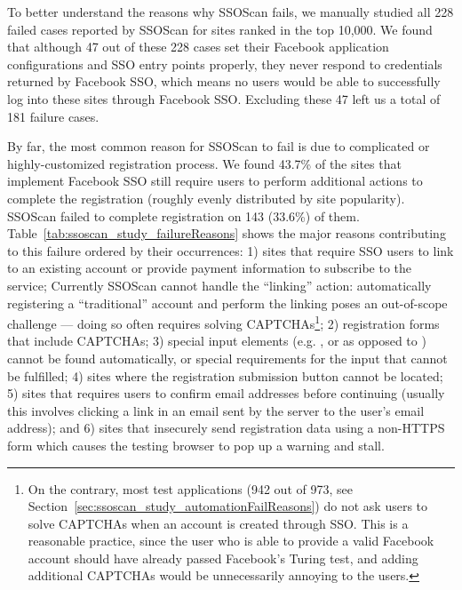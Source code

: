 To better understand the reasons why SSOScan fails, we manually studied all 228 failed cases reported by SSOScan for sites ranked in the top 10,000.  We found that although 47 out of these 228 cases set their Facebook application configurations and SSO entry points properly, they never respond to credentials returned by Facebook SSO, which means no users would be able to successfully log into these sites through Facebook SSO.  Excluding these 47 left us a total of 181 failure cases.

 By far, the most common reason for SSOScan to fail is due to complicated or highly-customized registration process.  We found 43.7\% of the sites that implement Facebook SSO still require users to perform additional actions to complete the registration (roughly evenly distributed by site popularity).  SSOScan failed to complete registration on 143 (33.6\%) of them.  Table~\ref{tab:ssoscan_study_failureReasons} shows the major reasons contributing to this failure ordered by their occurrences: 1) sites that require SSO users to link to an existing account or provide payment information to subscribe to the service; Currently SSOScan cannot handle the ``linking'' action: automatically registering a ``traditional'' account and perform the linking poses an out-of-scope challenge --- doing so often requires solving CAPTCHAs\footnote{On the contrary, most test applications (942 out of 973, see Section~\ref{sec:ssoscan_study_automationFailReasons}) do not ask users to solve CAPTCHAs when an account is created through SSO.  This is a reasonable practice, since the user who is able to provide a valid Facebook account should have already passed Facebook's Turing test, and adding additional CAPTCHAs would be unnecessarily annoying to the users.}; 2) registration forms that include CAPTCHAs; 3) special input elements (e.g. ,  or  as opposed to ) cannot be found automatically, or special requirements for the input that cannot be fulfilled; 4) sites where the registration submission button cannot be located; 5) sites that requires users to confirm email addresses before continuing (usually this involves clicking a link in an email sent by the server to the user's email address); and 6) sites that insecurely send registration data using a non-HTTPS form which causes the testing browser to pop up a warning and stall.


